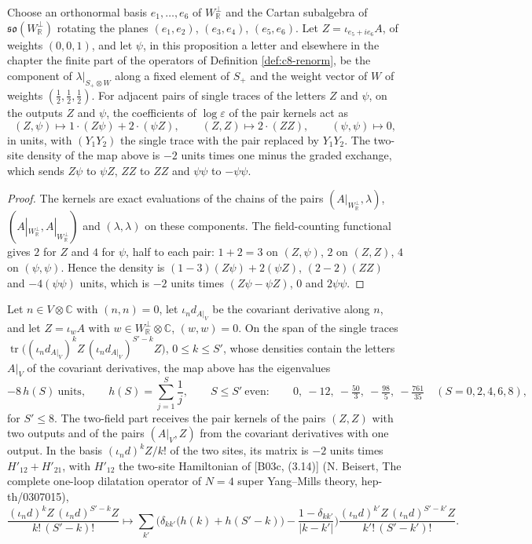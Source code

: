 \begin{proposition}
\label{prop:c10-su11}
Choose an orthonormal basis $e_1,\dots,e_6$ of $W_{\mathbb R}^\perp$ and the Cartan subalgebra of $\mathfrak{so}(W_{\mathbb R}^\perp)$ rotating the planes $(e_1,e_2)$, $(e_3,e_4)$, $(e_5,e_6)$. Let $Z=\iota_{e_5+ie_6}A$, of weights $(0,0,1)$, and let $\psi$, in this proposition a letter and elsewhere in the chapter the finite part of the operators of Definition \ref{def:c8-renorm}, be the component of $\lambda|_{S_+\otimes W}$ along a fixed element of $S_+$ and the weight vector of $W$ of weights $(\tfrac12,\tfrac12,\tfrac12)$. For adjacent pairs of single traces of the letters $Z$ and $\psi$, on the outputs $Z$ and $\psi$, the coefficients of $\log\varepsilon$ of the pair kernels act as
\[
(Z,\psi)\mapsto1\cdot(Z\psi)+2\cdot(\psi Z),\qquad (Z,Z)\mapsto2\cdot(ZZ),\qquad (\psi,\psi)\mapsto0,
\]
in units, with $(Y_1Y_2)$ the single trace with the pair replaced by $Y_1Y_2$. The two-site density of the map above is $-2$ units times one minus the graded exchange, which sends $Z\psi$ to $\psi Z$, $ZZ$ to $ZZ$ and $\psi\psi$ to $-\psi\psi$.
\end{proposition}

\begin{proof}
The kernels are exact evaluations of the chains of the pairs $(A|_{W_{\mathbb R}^\perp},\lambda)$, $(A|_{W_{\mathbb R}^\perp},A|_{W_{\mathbb R}^\perp})$ and $(\lambda,\lambda)$ on these components. The field-counting functional gives $2$ for $Z$ and $4$ for $\psi$, half to each pair: $1+2=3$ on $(Z,\psi)$, $2$ on $(Z,Z)$, $4$ on $(\psi,\psi)$. Hence the density is $(1-3)(Z\psi)+2(\psi Z)$, $(2-2)(ZZ)$ and $-4(\psi\psi)$ units, which is $-2$ units times $(Z\psi-\psi Z)$, $0$ and $2\psi\psi$.
\end{proof}

\begin{proposition}
\label{prop:c10-twist}
Let $n\in V\otimes\mathbb C$ with $(n,n)=0$, let $\iota_nd_{A|_V}$ be the covariant derivative along $n$, and let $Z=\iota_wA$ with $w\in W_{\mathbb R}^\perp\otimes\mathbb C$, $(w,w)=0$. On the span of the single traces $\operatorname{tr}\big((\iota_nd_{A|_V})^kZ\,(\iota_nd_{A|_V})^{S'-k}Z\big)$, $0\le k\le S'$, whose densities contain the letters $A|_V$ of the covariant derivatives, the map above has the eigenvalues
\[
-8\,h(S)\ \text{units},\qquad h(S)=\sum_{j=1}^S\frac1j,\qquad S\le S'\ \text{even}:\qquad 0,\ -12,\ -\tfrac{50}3,\ -\tfrac{98}5,\ -\tfrac{761}{35}\quad(S=0,2,4,6,8),
\]
for $S'\le8$. The two-field part receives the pair kernels of the pairs $(Z,Z)$ with two outputs and of the pairs $(A|_V,Z)$ from the covariant derivatives with one output. In the basis $(\iota_nd)^kZ/k!$ of the two sites, its matrix is $-2$ units times $H'_{12}+H'_{21}$, with $H'_{12}$ the two-site Hamiltonian of [B03c, (3.14)] (N. Beisert, The complete one-loop dilatation operator of $N=4$ super Yang--Mills theory, hep-th/0307015),
\[
\frac{(\iota_nd)^kZ\,(\iota_nd)^{S'-k}Z}{k!\,(S'-k)!}\longmapsto\sum_{k'}\Big(\delta_{kk'}\big(h(k)+h(S'-k)\big)-\frac{1-\delta_{kk'}}{|k-k'|}\Big)\frac{(\iota_nd)^{k'}Z\,(\iota_nd)^{S'-k'}Z}{k'!\,(S'-k')!}.
\]
\end{proposition}


